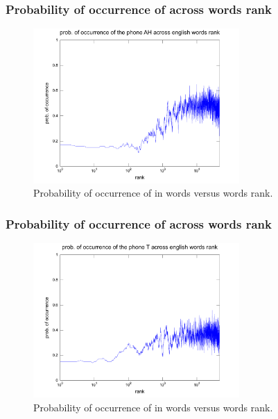 \documentclass[notes]{beamer}
\begin{document}
\frame
{
  \frametitle{Probability of occurrence of \textipa{[@]} across words rank}
\begin{figure}[h!]
\centering
\includegraphics[width=0.7\textwidth]{images/proboccwordsphone_AH.pdf}
\caption{Probability of occurrence of \textipa{[@]} in words versus words rank.}
\label{fig:proboccwordsphone_AH}
\end{figure} 
}


\frame
{
  \frametitle{Probability of occurrence of \textipa{[t]} across words rank}
\begin{figure}[h!]
\centering
\includegraphics[width=0.7\textwidth]{images/proboccwordsphone_T.pdf}
\caption{Probability of occurrence of \textipa{[t]} in words versus words rank.}
\label{fig:proboccwordsphone_T}
\end{figure} 
}
\end{document}
